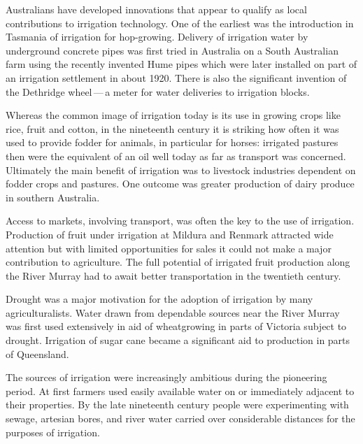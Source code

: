 Australians have developed innovations that appear to qualify as local
contributions to irrigation technology.  One of the earliest was the
introduction in Tasmania of irrigation for hop-growing.  Delivery of
irrigation water by underground concrete pipes 
was first tried in Australia on a South Australian farm using the
recently invented Hume pipes which were later installed on part of an
irrigation settlement in about 1920.  There is also the significant
invention of the Dethridge wheel\,---\,a  meter
for water deliveries to irrigation blocks.

\bigskip\noindent
Whereas the common image of irrigation today is its use in growing
crops like rice, fruit and cotton, in the nineteenth century it is
striking how often it was used to provide fodder for animals, in
particular for horses: irrigated pastures then were the equivalent of
an oil well today as far as transport was concerned. Ultimately the
main benefit of irrigation was to livestock industries dependent on
fodder crops and pastures. One outcome was greater production of dairy
produce in southern Australia.

Access to markets, involving transport, was often the key to the use
of irrigation. Production of fruit under irrigation at Mildura
 and Renmark  attracted wide attention
but with limited opportunities for sales it could not make a major
contribution to agriculture. The full potential of irrigated fruit
production along the River Murray  had to await
better transportation in the twentieth century.

Drought was a major motivation for the adoption of irrigation by many
agriculturalists. Water drawn from dependable sources near the River
Murray was first used extensively in aid of wheatgrowing in parts of
Victoria subject to drought. Irrigation of sugar cane became a
significant aid to production in parts of Queensland.

The sources of irrigation were increasingly ambitious during the
pioneering period. At first farmers used easily available water on or
immediately adjacent to their properties. By the late nineteenth
century people were experimenting with sewage, artesian bores, and
river water carried over considerable distances for the purposes of
irrigation.

